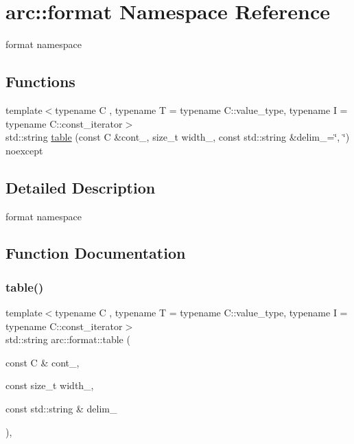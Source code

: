 \hypertarget{namespacearc_1_1format}{}\section{arc\+:\+:format Namespace Reference}
\label{namespacearc_1_1format}


format namespace  


\subsection*{Functions}
\begin{DoxyCompactItemize}
\item 
{\footnotesize template$<$typename C , typename T  = typename C\+::value\+\_\+type, typename I  = typename C\+::const\+\_\+iterator$>$ }\\std\+::string \mbox{\hyperlink{namespacearc_1_1format_a0c2871882ac6679e40c71a2176ddd529}{table}} (const C \&cont\+\_\+, size\+\_\+t width\+\_, const std\+::string \&delim\+\_\+=\char`\"{}, \char`\"{}) noexcept
\end{DoxyCompactItemize}


\subsection{Detailed Description}
format namespace 

\subsection{Function Documentation}
\mbox{\label{namespacearc_1_1format_a0c2871882ac6679e40c71a2176ddd529}} 
\subsubsection{\texorpdfstring{table()}{table()}}
{\footnotesize\ttfamily template$<$typename C , typename T  = typename C\+::value\+\_\+type, typename I  = typename C\+::const\+\_\+iterator$>$ \\
std\+::string arc\+::format\+::table (\begin{DoxyParamCaption}\item[{const C \&}]{cont\+\_\+,  }\item[{const size\+\_\+t}]{width\+\_\+,  }\item[{const std\+::string \&}]{delim\+\_\+ }\end{DoxyParamCaption})\hspace{0.3cm}{\ttfamily [inline]}, {\ttfamily [noexcept]}}

